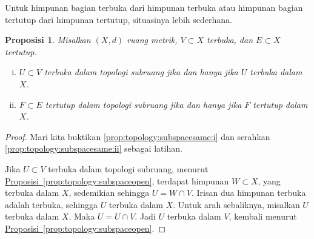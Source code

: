 \documentclass[12pt,openany]{book}
\theoremstyle{plain}
\newtheorem{prop}[thm]{Proposisi}
\theoremstyle{remark}
\theoremstyle{definition}
\theoremstyle{exercise}
\theoremstyle{example}
\newcommand{\propref}[1]{\hyperref[#1]{Proposisi~\ref*{#1}}}
\begin{document}
Untuk himpunan bagian terbuka dari himpunan terbuka atau himpunan bagian tertutup dari himpunan
tertutup, situasinya lebih sederhana.

\begin{prop} \label{prop:topology:subspacesame}
Misalkan $(X,d)$ ruang metrik, $V \subset X$ terbuka,
dan $E \subset X$ tertutup.
\begin{enumerate}[(i)]
\item \label{prop:topology:subspacesame:i}
$U \subset V$ terbuka dalam topologi subruang jika dan hanya jika $U$ terbuka
dalam $X$.
\item \label{prop:topology:subspacesame:ii}
$F \subset E$ tertutup dalam topologi subruang jika dan hanya jika $F$
tertutup dalam $X$.
\end{enumerate}
\end{prop}

\begin{proof}
Mari kita buktikan
\ref{prop:topology:subspacesame:i}
dan serahkan
\ref{prop:topology:subspacesame:ii} sebagai latihan.

Jika $U \subset V$ terbuka dalam topologi subruang, menurut
\propref{prop:topology:subspaceopen}, terdapat himpunan $W \subset X$,
yang terbuka dalam $X$, sedemikian sehingga $U = W \cap V$. Irisan dua himpunan terbuka
adalah terbuka, sehingga $U$ terbuka dalam $X$.
Untuk arah sebaliknya,
misalkan $U$ terbuka dalam $X$. Maka $U = U \cap V$. Jadi
$U$ terbuka dalam $V$, kembali menurut \propref{prop:topology:subspaceopen}.
\end{proof}
\end{document}
